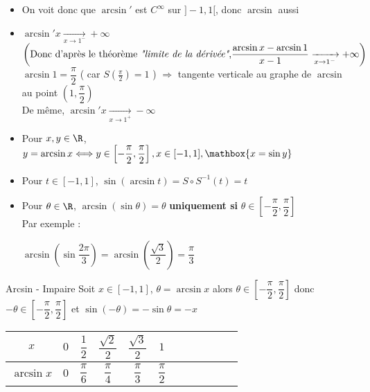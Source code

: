 \documentclass[12pt,a4paper]{report}
\begin{document}
\begin{remarque}[Remarques]
\begin{itemize}
    \item On voit donc que $\arcsin'$ est $C^\infty$ sur $]-1,1[$, donc $\arcsin$ aussi 
    \item $\arcsin'x \xrightarrow[x \to 1^-]{} + \infty$\\
    $\left(\text{Donc d'après le théorème \textit{"limite de la dérivée"},} \dfrac{\arcsin x - \arcsin 1}{x-1} \xrightarrow[x\to 1^-]{} + \infty\right)$\\
    $\arcsin 1 = \dfrac{\pi}{2}$ ( car $S(\frac{\pi}{2})=1$ ) $\Longrightarrow$ tangente verticale au graphe de $\arcsin$ au point $\left(1,\dfrac{\pi}{2}\right)$\\
    De même, $\arcsin'x \xrightarrow[x \to 1^+]{} - \infty$
    \item Pour $x,y \in \R$, $y= \arcsin x \Longleftrightarrow y\in \left[-\dfrac{\pi}{2}, \dfrac{\pi}{2}\right], x \in [-1,1], \mathbox{x = \sin y}$
    \item Pour $t\in [-1,1]$, $\sin(\arcsin t)= S\circ S^{-1} (t)=t$
    \item Pour $\theta \in \R$, $\arcsin (\sin \theta)= \theta$ \textbf{uniquement si} $\theta \in \left[-\dfrac{\pi}{2}, \dfrac{\pi}{2}\right]$\\
    Par exemple : 
    \begin{center}
        $\arcsin \left(\sin \dfrac{2\pi}{3} \right)=\arcsin \left(\dfrac{\sqrt{3}}{2}\right)=\dfrac{\pi}{3}$
    \end{center}
\end{itemize}
\end{remarque}

\begin{propositions}{Arcsin - Impaire}{}
Soit $x\in [-1,1]$, $\theta=\arcsin x$ alors $\theta \in \left[-\dfrac{\pi}{2}, \dfrac{\pi}{2}\right]$ donc $-\theta \in \left[-\dfrac{\pi}{2}, \dfrac{\pi}{2}\right]$ et $\sin (-\theta) = -\sin \theta = -x$
\begin{center}
\end{center}
\end{propositions}

\begin{remarque}
\begin{center}
    \begin{tabular}{|Sc|Sc|Sc|Sc|Sc|Sc|}
      \hline
      $x$ & $0$ & $\dfrac{1}{2}$ & $\dfrac{\sqrt{2}}{2}$ & $\dfrac{\sqrt{3}}{2}$ & $1$\\
      \hline
      $\arcsin x$ & $0$ & $\dfrac{\pi}{6}$ & $\dfrac{\pi}{4}$ & $\dfrac{\pi}{3}$ & $\dfrac{\pi}{2}$\\
      \hline
     \end{tabular}
     \\
\end{center}
\end{remarque}
\end{document}
